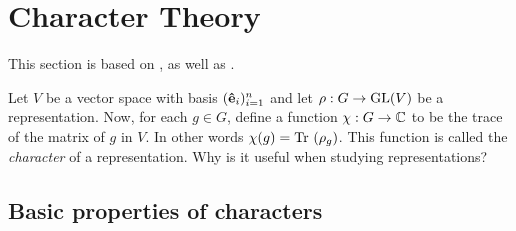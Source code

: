 \clearpage{\thispagestyle{empty}}
\section{Character Theory}

This section is based on \cite[Ch.2.]{Serre}, as well as \cite[Sect.2.2.]{FultonHarris}.

Let $V$ be a vector space with basis $(\mathbf{\hat{e}}_i)_{i=1}^n$ and let $\rho: G \rightarrow \text{GL}(V)$ be a representation. Now, for each $g \in G$, define a function $\chi: G \rightarrow \mathbb{C}$ to be the trace of the matrix of $g$ in $V$. In other words $\chi(g) = \text{Tr }(\rho_g)$. This function is called the \emph{character} of a representation. Why is it useful when studying representations?

\subsection{Basic properties of characters}

